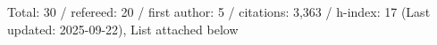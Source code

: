 Total: 30 / refereed: 20 / first author: 5 / citations: 3,363 / h-index: 17 (Last updated: 2025-09-22), List attached below
